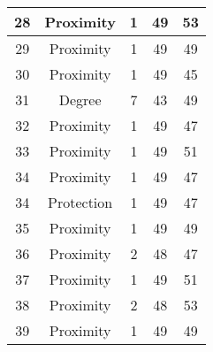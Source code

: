 \documentclass[results.tex]{subfiles}
\begin{document}
\begin{center}
\begin{tabular}{| c || c | c | c | c |}
            \hline
            28                      & Proximity                    & 1                      & 49                      & 53                   \\
            \hline
            29                      & Proximity                    & 1                      & 49                      & 49                   \\
            \hline
            30                      & Proximity                    & 1                      & 49                      & 45                   \\
            \hline
            31                      & Degree                       & 7                      & 43                      & 49                   \\
            \hline
            32                      & Proximity                    & 1                      & 49                      & 47                   \\
            \hline
            33                      & Proximity                    & 1                      & 49                      & 51                   \\
            \hline
            34                      & Proximity                    & 1                      & 49                      & 47                   \\
            \hline
            34                      & Protection                   & 1                      & 49                      & 47                   \\
            \hline
            35                      & Proximity                    & 1                      & 49                      & 49                   \\
            \hline
            36                      & Proximity                    & 2                      & 48                      & 47                   \\
            \hline
            37                      & Proximity                    & 1                      & 49                      & 51                   \\
            \hline
            38                      & Proximity                    & 2                      & 48                      & 53                   \\
            \hline
            39                      & Proximity                    & 1                      & 49                      & 49                   \\

\end{tabular}
\end{center}
\end{document}
